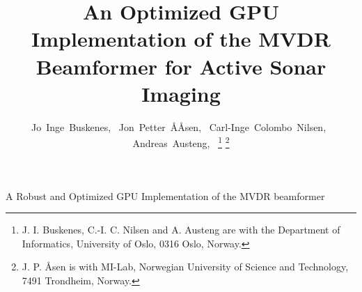 % 
%
\title{An Optimized GPU Implementation of the MVDR Beamformer for Active Sonar Imaging}%
%
\author{Jo~Inge~Buskenes,~ %
        Jon~Petter~\AA{}Åsen,~ %
        Carl-Inge~Colombo~Nilsen,~ %
        Andreas~Austeng,~%
\thanks{J. I. Buskenes, C.-I. C. Nilsen and A. Austeng are with the Department of Informatics, University of Oslo, 0316 Oslo, Norway.}%
\thanks{J. P. \AA{}sen is with MI-Lab, Norwegian University of Science and Technology, 7491 Trondheim, Norway.}%
}%
%
%
{A Robust and Optimized GPU Implementation of the MVDR beamformer}%
%
%
%
